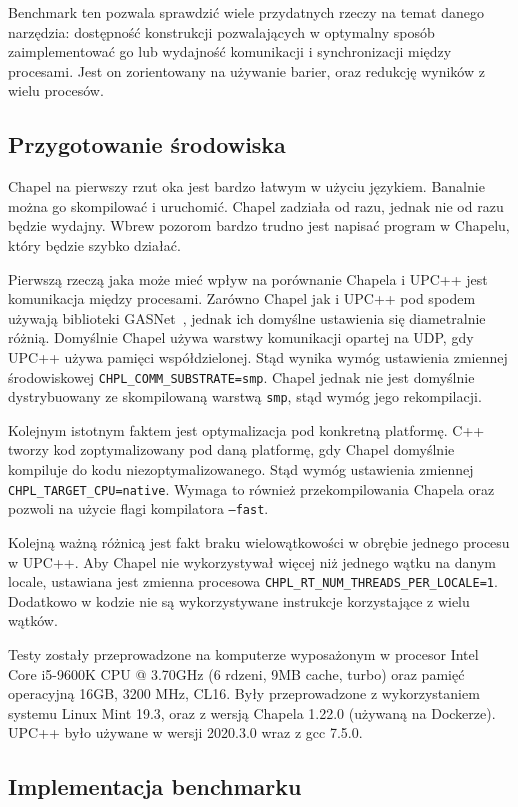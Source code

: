 Benchmark ten pozwala sprawdzić wiele przydatnych rzeczy na temat danego narzędzia:
dostępność konstrukcji pozwalających w optymalny sposób zaimplementować go lub
wydajność komunikacji i synchronizacji między procesami.
Jest on zorientowany na używanie barier, oraz redukcję wyników
z wielu procesów.

\subsection{Przygotowanie środowiska}

Chapel na pierwszy rzut oka jest bardzo łatwym w użyciu językiem.
Banalnie można go skompilować i uruchomić.
Chapel zadziała od razu, jednak nie od razu będzie wydajny.
Wbrew pozorom bardzo trudno jest napisać program w Chapelu,
który będzie szybko działać.

Pierwszą rzeczą jaka może mieć wpływ na porównanie Chapela i UPC++
jest komunikacja między procesami.
Zarówno Chapel jak i UPC++ pod spodem używają biblioteki GASNet~\cite{gasnet},
jednak ich domyślne ustawienia się diametralnie różnią.
Domyślnie Chapel używa warstwy komunikacji opartej na UDP, gdy
UPC++ używa pamięci współdzielonej.
Stąd wynika wymóg ustawienia zmiennej środowiskowej
\texttt{CHPL\_COMM\_SUBSTRATE=smp}.
Chapel jednak nie jest domyślnie dystrybuowany ze skompilowaną warstwą \texttt{smp},
stąd wymóg jego rekompilacji.

Kolejnym istotnym faktem jest optymalizacja pod konkretną platformę.
C++ tworzy kod zoptymalizowany pod daną platformę, gdy Chapel domyślnie
kompiluje do kodu niezoptymalizowanego.
Stąd wymóg ustawienia zmiennej \texttt{CHPL\_TARGET\_CPU=native}.
Wymaga to również przekompilowania Chapela
oraz pozwoli na użycie flagi kompilatora \texttt{--fast}.

Kolejną ważną różnicą jest fakt braku wielowątkowości w obrębie
jednego procesu w UPC++.
Aby Chapel nie wykorzystywał więcej niż jednego wątku na danym locale,
ustawiana jest zmienna procesowa \texttt{CHPL\_RT\_NUM\_THREADS\_PER\_LOCALE=1}.
Dodatkowo w kodzie nie są wykorzystywane instrukcje korzystające z
wielu wątków.

Testy zostały przeprowadzone na komputerze wyposażonym w procesor
Intel Core i5-9600K CPU @ 3.70GHz (6 rdzeni, 9MB cache, turbo)
oraz pamięć operacyjną 16GB, 3200 MHz, CL16.
Były przeprowadzone z wykorzystaniem systemu Linux Mint 19.3,
oraz z wersją Chapela 1.22.0 (używaną na Dockerze).
UPC++ było używane w wersji 2020.3.0 wraz
z gcc 7.5.0.


\subsection{Implementacja benchmarku}

